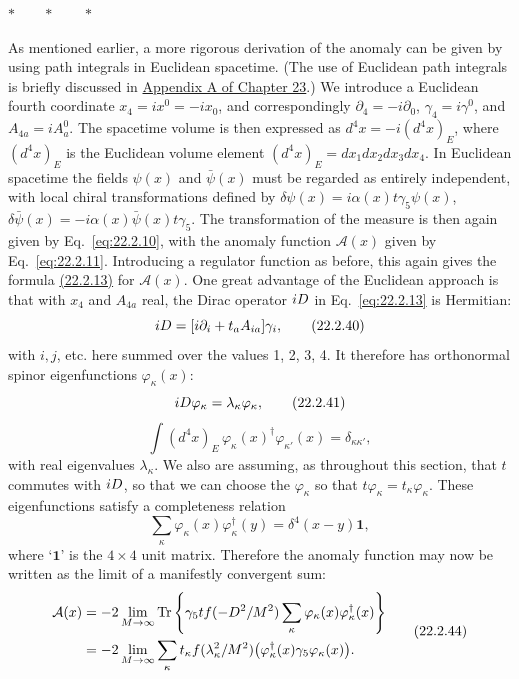\begin{center}
 $\ast\qquad\ast\qquad\ast$
\end{center}

As mentioned earlier, a more rigorous derivation of the anomaly can be
given by using path integrals in Euclidean spacetime. (The use of Euclidean
path integrals is briefly discussed in
\hyperref[app:23.A]{Appendix A of Chapter 23}.) We introduce a Euclidean
fourth coordinate $x_4=ix^0=-ix_0$, and correspondingly
$\partial_4=-i\partial_0$, $\gamma_4=i\gamma^0$, and
$A_{4a}=iA_a^0$. The spacetime volume is then expressed as
$d^4x=-i(d^4x)_E$, where $(d^4x)_E$ is the Euclidean volume element
$(d^4x)_E=dx_1dx_2dx_3dx_4$. In Euclidean spacetime the fields $\psi(x)$
and $\bar\psi(x)$ must be regarded as entirely independent, with local
chiral transformations defined by
$\delta\psi(x)=i\alpha(x)t\gamma_5\psi(x)$,
$\delta\bar\psi(x)=-i\alpha(x)\bar\psi(x)t\gamma_5$. The transformation of
the measure is then again given by Eq.~\eqref{eq:22.2.10}, with the anomaly
function $\mathcal A(x)$ given by Eq.~\eqref{eq:22.2.11}. Introducing a
regulator function as before, this again gives the formula
\hyperref[eq:22.2.13]{(22.2.13)} for $\mathcal A(x)$. One great advantage
of the Euclidean approach is that with $x_4$ and $A_{4a}$ real, the
Dirac operator $i\sl{D}$ in Eq.~\eqref{eq:22.2.13} is Hermitian:
\begin{equation}
 i\sl{D}=[i\partial_i+t_a A_{ia}]\gamma_i,
 \tag{22.2.40}\label{eq:22.2.40}
\end{equation}
with $i,j$, etc. here summed over the values 1, 2, 3, 4. It therefore has
orthonormal spinor eigenfunctions $\varphi_\kappa(x)$:
\begin{equation}
 i\sl{D}\varphi_\kappa=\lambda_\kappa\varphi_\kappa,
 \tag{22.2.41}\label{eq:22.2.41}
\end{equation}
\begin{equation}
 \int(d^4x)_E\,\varphi_\kappa(x)^\dagger\varphi_{\kappa'}(x)
 =\delta_{\kappa\kappa'},
 \tag{22.2.42}\label{eq:22.2.42}
\end{equation}
with real eigenvalues $\lambda_\kappa$. We also are assuming, as throughout
this section, that $t$ commutes with $i\sl{D}$, so that we can choose the
$\varphi_\kappa$ so that
$t\varphi_\kappa=t_\kappa\varphi_\kappa$. These eigenfunctions satisfy a
completeness relation
\begin{equation}
 \sum_\kappa\varphi_\kappa(x)\varphi_\kappa^\dagger(y)
 =\delta^4(x-y)\mathbf{1},
 \tag{22.2.43}\label{eq:22.2.43}
\end{equation}
where `$\mathbf{1}$' is the $4\times4$ unit matrix. Therefore the anomaly
function may now be written as the limit of a manifestly convergent sum:
\begin{equation}
 \begin{aligned}
 \mathcal A(x)
 &=-2\lim_{M\to\infty}\operatorname{Tr}
 \left\{\gamma_5t f(-\sl{D}^2/M^2)
 \sum_\kappa\varphi_\kappa(x)\varphi_\kappa^\dagger(x)\right\}\\
 &=-2\lim_{M\to\infty}\sum_\kappa
 t_\kappa f(\lambda_\kappa^2/M^2)
 \bigl(\varphi_\kappa^\dagger(x)\gamma_5\varphi_\kappa(x)\bigr).
 \end{aligned}
 \tag{22.2.44}\label{eq:22.2.44}
\end{equation}

